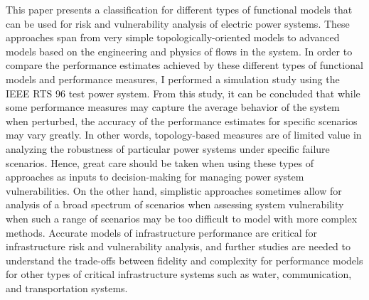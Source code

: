 This paper presents a classification for different types of functional models that can be used for risk and vulnerability analysis of electric power systems. These approaches span from very simple topologically-oriented models to advanced models based on the engineering and physics of flows in the system. In order to compare the performance estimates achieved by these different types of functional models and performance measures, I performed a simulation study using the IEEE RTS 96 test power system. From this study, it can be concluded that while some performance measures may capture the average behavior of the system when perturbed, the accuracy of the performance estimates for specific scenarios may vary greatly. In other words, topology-based measures are of limited value in analyzing the robustness of particular power systems under specific failure scenarios. Hence, great care should be taken when using these types of approaches as inputs to decision-making for managing power system vulnerabilities. On the other hand, simplistic approaches sometimes allow for analysis of a broad spectrum of scenarios when assessing system vulnerability when such a range of scenarios may be too difficult to model with more complex methods. Accurate models of infrastructure performance are critical for infrastructure risk and vulnerability analysis, and further studies are needed to understand the trade-offs between fidelity and complexity for performance models for other types of critical infrastructure systems such as water, communication, and transportation systems.


